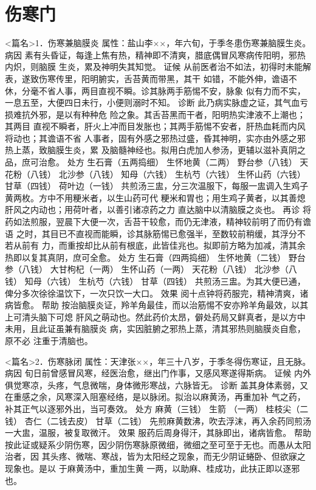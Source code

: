 \documentclass[a4paper,12pt,UTF8,twoside]{ctexbook}
\begin{document}
\chapter{伤寒门}
<篇名>1．伤寒兼脑膜炎
属性：盐山李××，年六旬，于季冬患伤寒兼脑膜生炎。 
病因 素有头昏证，每逢上焦有热，精神即不清爽，腊底偶冒风寒病传阳明，邪热内炽，则脑膜 
生炎，累及神明失其知觉。 
证候 从前医者治不如法，初得时未能解表，遂致伤寒传里，阳明腑实，舌苔黄而带黑，其干 
如错，不能外伸，谵语不休，分毫不省人事，两目直视不瞬。诊其脉两手筋惕不安，脉象 
似有力而不实，一息五至，大便四日未行，小便则溺时不知。 
诊断 此乃病实脉虚之证，其气血亏损难抗外邪，是以有种种危 
险之象。其舌苔黑而干者，阳明热实津液不上潮也；其两目 
直视不瞬者，肝火上冲而目发胀也；其两手筋惕不安者，肝热血耗而内风将动也；其谵语不省 
人事者，固有外感之邪热过盛，昏其神明，实亦由外感之邪热上蒸，致脑膜生炎，累 
及脑髓神经也。拟用白虎加人参汤，更辅以滋补真阴之品，庶可治愈。 
处方 生石膏（五两捣细） 生怀地黄（二两） 野台参（八钱） 天花粉（八钱） 
北沙参（八钱） 知母（六钱） 生杭芍（六钱） 生怀山药（六钱） 
甘草（四钱） 荷叶边（一钱） 
共煎汤三盅，分三次温服下，每服一盅调入生鸡子黄两枚。方中不用粳米者，以生山药可代 
粳米和胃也；用生鸡子黄者，以其善熄肝风之内动也；用荷叶者，以善引诸凉药之力 
直达脑中以清脑膜之炎也。 
再诊 将药如法煎服，翌晨下大便一次，舌苔干较愈，而仍无津液，精神较前明了而仍有谵语 
之时，其目已不直视而能瞬，诊其脉筋惕已愈强半，至数较前稍缓，其浮分不若从前有 
力，而重按却比从前有根底，此皆佳兆也。拟即前方略为加减，清其余热即以复其真阴，庶可全愈。 
处方 生石膏（四两捣细） 生怀地黄（二钱） 野台参（八钱） 大甘枸杞（一两） 
生怀山药（一两） 天花粉（八钱） 北沙参（八钱） 知母（六钱） 
生杭芍（六钱） 甘草（四钱） 
共煎汤三盅。为其大便已通，俾分多次徐徐温饮下，一次只饮一大口。 
效果 阅十点钟将药服完，精神清爽，诸病皆愈。 
帮助 按治脑膜炎证，羚羊角最佳，而以治筋惕不安亦羚羊角最效，以其上可清头脑下可熄 
肝风之萌动也。然此药价太昂，僻处药局又鲜真者，是以方中未用，且此证虽兼有脑膜炎 
病，实因脏腑之邪热上蒸，清其邪热则脑膜炎自愈，原不必 
注重于清脑也。 


<篇名>2．伤寒脉闭
属性：天津张××，年三十八岁，于季冬得伤寒证，且无脉。 
病因 旬日前曾感冒风寒，经医治愈，继出门作事，又感风寒遂得斯病。 
证候 内外俱觉寒凉，头疼，气息微喘，身体微形寒战，六脉皆无。 
诊断 盖其身体素弱，又在重感之余，风寒深入阻塞经络，是以脉闭。拟治以麻黄汤，再重加补 
气之药，补其正气以逐邪外出，当可奏效。 
处方 麻黄（三钱） 生箭 （一两） 桂枝尖（二钱） 杏仁（二钱去皮） 甘草（二钱） 
先煎麻黄数沸，吹去浮沫，再入余药同煎汤一大盅，温服，被复取微汗。 
效果 服药后周身得汗，其脉即出，诸病皆愈。 
帮助 按此证或疑系少阴伤寒，因少阴伤寒脉原微细，微细之至可至于无也。而愚从太阳治者，因 
其头疼、微喘、寒战，皆为太阳经之现象，而无少阴证蜷卧、但欲寐之现象也。是以 
于麻黄汤中，重加生黄 一两，以助麻、桂成功，此扶正即以逐邪也。 
\end{document}
